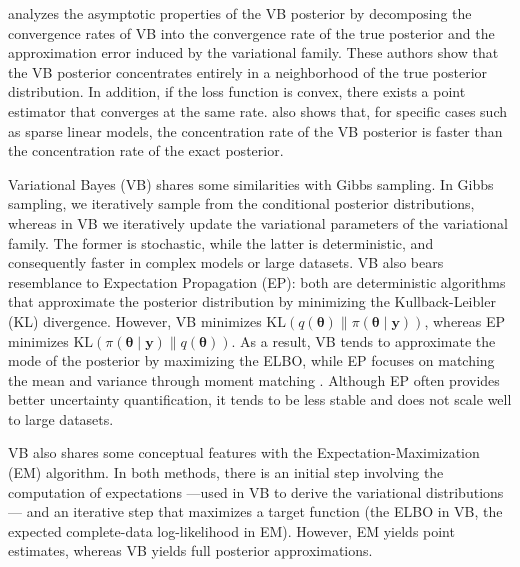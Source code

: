 
\cite{zhang2020convergence} analyzes the asymptotic properties of the VB posterior by decomposing the convergence rates of VB into the convergence rate of the true posterior and the approximation error induced by the variational family. These authors show that the VB posterior concentrates entirely in a neighborhood of the true posterior distribution. In addition, if the loss function is convex, there exists a point estimator that converges at the same rate. \cite{zhang2020convergence} also shows that, for specific cases such as sparse linear models, the concentration rate of the VB posterior is faster than the concentration rate of the exact posterior.

Variational Bayes (VB) shares some similarities with Gibbs sampling. In Gibbs sampling, we iteratively sample from the conditional posterior distributions, whereas in VB we iteratively update the variational parameters of the variational family. The former is stochastic, while the latter is deterministic, and consequently faster in complex models or large datasets. VB also bears resemblance to Expectation Propagation (EP): both are deterministic algorithms that approximate the posterior distribution by minimizing the Kullback-Leibler (KL) divergence. However, VB minimizes $\text{KL}(q(\boldsymbol{\theta}) \| \pi(\boldsymbol{\theta} \mid \boldsymbol{y}))$, whereas EP minimizes $\text{KL}(\pi(\boldsymbol{\theta} \mid \boldsymbol{y}) \| q(\boldsymbol{\theta}))$. As a result, VB tends to approximate the mode of the posterior by maximizing the ELBO, while EP focuses on matching the mean and variance through moment matching \cite{bishop2006pattern,gelman2021bayesian}. Although EP often provides better uncertainty quantification, it tends to be less stable and does not scale well to large datasets.

VB also shares some conceptual features with the Expectation-Maximization (EM) algorithm. In both methods, there is an initial step involving the computation of expectations —used in VB to derive the variational distributions— and an iterative step that maximizes a target function (the ELBO in VB, the expected complete-data log-likelihood in EM). However, EM yields point estimates, whereas VB yields full posterior approximations.\\

